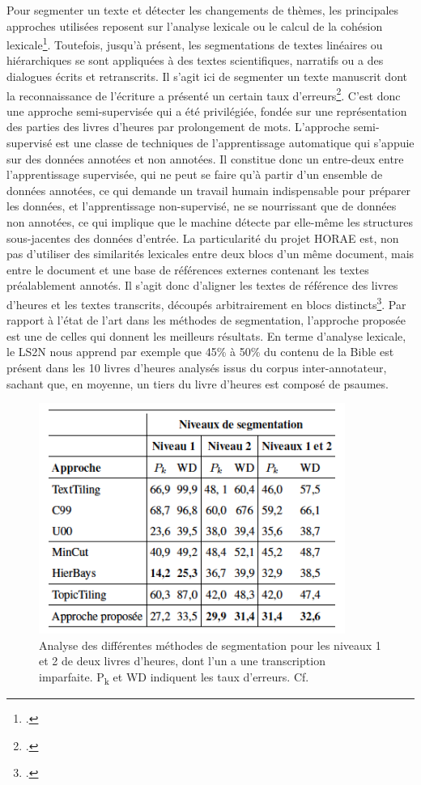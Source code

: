 \documentclass[a4paper,12pt,twoside]{book}
\begin{document}
	Pour segmenter un texte et détecter les changements de thèmes, les principales approches utilisées reposent sur l'analyse lexicale ou le calcul de la cohésion lexicale\footcite[p. 27]{Seg_Livres_Heures}. Toutefois, jusqu'à présent, les segmentations de textes linéaires ou hiérarchiques se sont appliquées à des textes scientifiques, narratifs ou a des dialogues écrits et retranscrits. Il s'agit ici de segmenter un texte manuscrit dont la reconnaissance de l'écriture a présenté un certain taux d'erreurs\footcite[p. 28]{Seg_Livres_Heures}. C'est donc une approche semi-supervisée qui a été privilégiée, fondée sur une représentation des parties des livres d'heures par prolongement de mots. L'approche semi-supervisé est une classe de techniques de l'apprentissage automatique qui s'appuie sur des données annotées et non annotées. Il constitue donc un entre-deux entre l'apprentissage supervisée, qui ne peut se faire qu'à partir d'un ensemble de données annotées, ce qui demande un travail humain indispensable pour préparer les données, et l'apprentissage non-supervisé, ne se nourrissant que de données non annotées, ce qui implique que le machine détecte par elle-même les structures sous-jacentes des données d'entrée. La particularité du projet HORAE est, non pas d'utiliser des similarités lexicales entre deux blocs d'un même document, mais entre le document et une base de références externes contenant les textes préalablement annotés. Il s'agit donc d'aligner les textes de référence des livres d'heures et les textes transcrits, découpés arbitrairement en blocs distincts\footcite[p. 29]{Seg_Livres_Heures}. Par rapport à l'état de l'art dans les méthodes de segmentation, l'approche proposée est une de celles qui donnent les meilleurs résultats. En terme d'analyse lexicale, le LS2N nous apprend par exemple que 45\% à 50\% du contenu de la Bible est présent dans les 10 livres d’heures analysés issus du corpus inter-annotateur, sachant que, en moyenne, un tiers du livre d’heures est composé de psaumes.
	
    \begin{figure}[!h]
    \centering
    \includegraphics[width=10cm]{img/ML/Niveau_Segmentation.png}
    \caption{Analyse des différentes méthodes de segmentation pour les niveaux 1 et 2 de deux livres d'heures, dont l'un a une transcription imparfaite. P\textsubscript{k} et WD indiquent les taux d'erreurs. Cf. \cite[p. 32]{Seg_Livres_Heures}}
    \end{figure}
    
\end{document}
